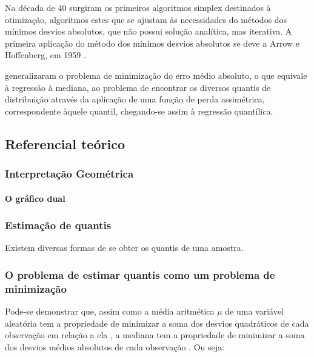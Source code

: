 \documentclass[a4paper, 12pt]{article}
\let\oldparagraph\paragraph
\renewcommand{\paragraph}[1]{\oldparagraph{#1}\mbox{}}
\begin{document}
Na década de 40 surgiram os primeiros algoritmos simplex destinados à
otimização, algoritmos estes que se ajustam às necessidades do métodos
dos mínimos desvios absolutos, que não possui solução analítica, mas
iterativa. A primeira aplicação do método dos mínimos desvios absolutos
se deve a Arrow e Hoffenberg, em 1959 \autocite[281]{tortoise}.

\textcite{koenker1978} generalizaram o problema de minimização do erro
médio absoluto, o que equivale à regressão à mediana, ao problema de
encontrar os diversos quantis de distribuição através da aplicação de
uma função de perda assimétrica, correspondente àquele quantil,
chegando-se assim à regressão quantílica.

\hypertarget{referencial-teorico}{%
\subsection{Referencial teórico}\label{referencial-teorico}}

\hypertarget{interpretacao-geometrica}{%
\subsubsection{Interpretação
Geométrica}\label{interpretacao-geometrica}}

\hypertarget{o-grafico-dual}{%
\paragraph{O gráfico dual}\label{o-grafico-dual}}

\hypertarget{estimacao-de-quantis}{%
\subsubsection{Estimação de quantis}\label{estimacao-de-quantis}}

Existem diversas formas de se obter os quantis de uma amostra.

\hypertarget{o-problema-de-estimar-quantis-como-um-problema-de-minimizacao}{%
\subsubsection{O problema de estimar quantis como um problema de
minimização}\label{o-problema-de-estimar-quantis-como-um-problema-de-minimizacao}}

Pode-se demonstrar que, assim como a média aritmética \(\mu\) de uma
variável aleatória tem a propriedade de minimizar a soma dos desvios
quadráticos de cada observação em relação a ela
\autocite[50]{matloff2017}, a mediana tem a propriedade de minimizar a
soma dos desvios médios absolutos de cada observação
\autocite[260]{matloff2017}. Ou seja:
\end{document}
